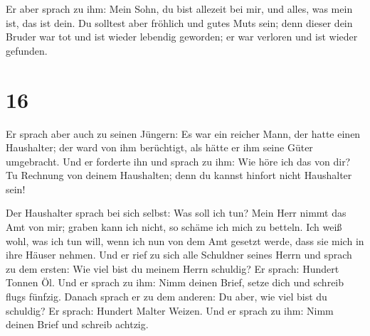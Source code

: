  Er aber sprach zu ihm: Mein Sohn, du bist allezeit bei
mir, und alles, was mein ist, das ist dein.  Du solltest
aber fröhlich und gutes Muts sein; denn dieser dein Bruder war tot und
ist wieder lebendig geworden; er war verloren und ist wieder gefunden.

\hypertarget{section-15}{%
\section{16}\label{section-15}}

 Er sprach aber auch zu seinen Jüngern: Es war ein reicher
Mann, der hatte einen Haushalter; der ward von ihm berüchtigt, als hätte
er ihm seine Güter umgebracht.  Und er forderte ihn und
sprach zu ihm: Wie höre ich das von dir? Tu Rechnung von deinem
Haushalten; denn du kannst hinfort nicht Haushalter sein!

 Der Haushalter sprach bei sich selbst: Was soll ich tun?
Mein Herr nimmt das Amt von mir; graben kann ich nicht, so schäme ich
mich zu betteln.  Ich weiß wohl, was ich tun will, wenn
ich nun von dem Amt gesetzt werde, dass sie mich in ihre Häuser nehmen.
 Und er rief zu sich alle Schuldner seines Herrn und
sprach zu dem ersten: Wie viel bist du meinem Herrn schuldig?
 Er sprach: Hundert Tonnen Öl. Und er sprach zu ihm: Nimm
deinen Brief, setze dich und schreib flugs fünfzig. 
Danach sprach er zu dem anderen: Du aber, wie viel bist du schuldig? Er
sprach: Hundert Malter Weizen. Und er sprach zu ihm: Nimm deinen Brief
und schreib achtzig.

